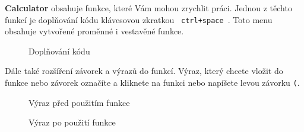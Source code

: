 \documentclass[a4paper, 11pt]{article}
\begin{document}
\textbf{Calculator} obsahuje funkce, které Vám mohou zrychlit práci.
Jednou z těchto funkcí je doplňování kódu klávesovou zkratkou
\texttt{ ctrl+space }. Toto menu obsahuje vytvořené proměnné i vestavěné funkce.

\begin{figure}[H]
    \centering
    \caption{Doplňování kódu}
\end{figure}

Dále také rozšíření závorek a výrazů do funkcí. Výraz, který chcete
vložit do funkce nebo závorek označíte a kliknete na funkci nebo
napíšete levou závorku \texttt{(}.

\begin{figure}[H]
    \centering
    \caption{Výraz před použitím funkce}
\end{figure}

\begin{figure}[H]
    \centering
    \caption{Výraz po použití funkce}
\end{figure}
\end{document}
